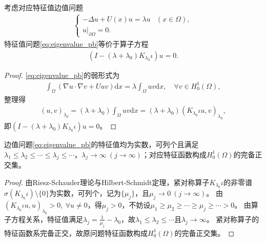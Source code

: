\documentclass[../../main.tex]{subfiles}%
\begin{document}
\begin{proposition}
考虑对应特征值边值问题
\begin{align}
\begin{cases}
-\Delta u+U(x)u=\lambda u &(x\in\Omega),\\
u|_{\partial\Omega}=0.
\end{cases}
\label{eq:eigenvalue_pb}
\end{align}
特征值问题\eqref{eq:eigenvalue_pb}等价于算子方程
\begin{align*}
\left(I-\left(\lambda+\lambda_0\right)K_{\lambda_0}\iota\right)u=0.
\end{align*}
\end{proposition}
\begin{proof}
\eqref{eq:eigenvalue_pb}的弱形式为
\begin{align*}
\int_{\Omega}\left(\nabla u\cdot\nabla v+Uuv\right)\mathrm{d}x=\lambda\int_{\Omega}uv\mathrm{d}x,\quad\forall v\in H_0^1(\Omega),
\end{align*}
整理得
\begin{align*}
(u,v)_{\lambda_0}=\left(\lambda+\lambda_0\right)\int_{\Omega}uv\mathrm{d}x=\left(\lambda+\lambda_0\right)(K_{\lambda_0}\iota u,v)_{\lambda_0},
\end{align*}
即$\left(I-\left(\lambda+\lambda_0\right)K_{\lambda_0}\iota\right)u=0$。
\end{proof}

\begin{theorem}
边值问题\eqref{eq:eigenvalue_pb}的特征值均为实数，可列个且满足$\lambda_1\leqslant\lambda_2\leqslant\cdots\leqslant\lambda_j\leqslant\cdots$，$\lambda_j\to\infty\ (j\to\infty)$；对应特征函数构成$H_0^1(\Omega)$的完备正交集。
\end{theorem}
\begin{proof}
由Riesz-Schauder理论与Hilbert-Schmidt定理，紧对称算子$K_{\lambda_0}\iota$的非零谱$\sigma(K_{\lambda_0}\iota)\setminus\{0\}$为实数，可列个，记为$\{\mu_j\}$，且$\mu_j\to0\ (j\to\infty)$。
由$(K_{\lambda_0}\iota u,u)_{\lambda_0}>0,\ \forall u\neq0$，得$\mu_j>0$，不妨设$\mu_1\geqslant\mu_2\geqslant\cdots\geqslant\mu_j\geqslant\cdots>0$。
由算子方程关系，特征值满足$\lambda_j=\frac{1}{\mu_j}-\lambda_0$，故$\lambda_1\leqslant\lambda_2\leqslant\cdots$且$\lambda_j\to\infty$。
紧对称算子的特征函数系完备正交，故原问题特征函数构成$H_0^1(\Omega)$的完备正交集。
\end{proof}
\end{document}
